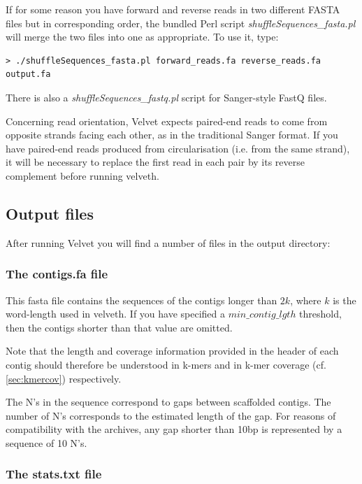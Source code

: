 \documentclass{article}
\begin{document}
If for some reason you have forward and reverse reads in two different FASTA files
but in corresponding order, the bundled Perl script \emph{shuffleSequences\_fasta.pl} will
merge the two files into one as appropriate. To use it, type:
\begin{verbatim}
> ./shuffleSequences_fasta.pl forward_reads.fa reverse_reads.fa output.fa
\end{verbatim}

There is also a \emph{shuffleSequences\_fastq.pl} script for Sanger-style FastQ files.

Concerning read orientation, Velvet expects paired-end reads to come from opposite strands facing each other, as in the traditional Sanger format. If you have paired-end reads produced from circularisation (i.e. from the same strand), it will be necessary to replace the first read in each pair by its reverse complement before running velveth.

\subsection{Output files} 

\label{sec:output}

After running Velvet you will find a number of files in the output directory:

\subsubsection{The contigs.fa file}

\label{sec:fasta}

This fasta file contains the sequences of the contigs longer than $2k$, where $k$ is the word-length used in velveth. If you have specified a $min\_contig\_lgth$ threshold, then the contigs shorter than that value are omitted.

Note that the length and coverage information provided in the header of each contig should therefore be understood in k-mers and in k-mer coverage (cf. \ref{sec:kmercov}) respectively.

The N's in the sequence correspond to gaps between scaffolded contigs. The number of N's corresponds to the estimated length of the gap. For reasons of compatibility with the archives, any gap shorter than 10bp is represented by a sequence of 10 N's.

\subsubsection{The stats.txt file}
\end{document}
